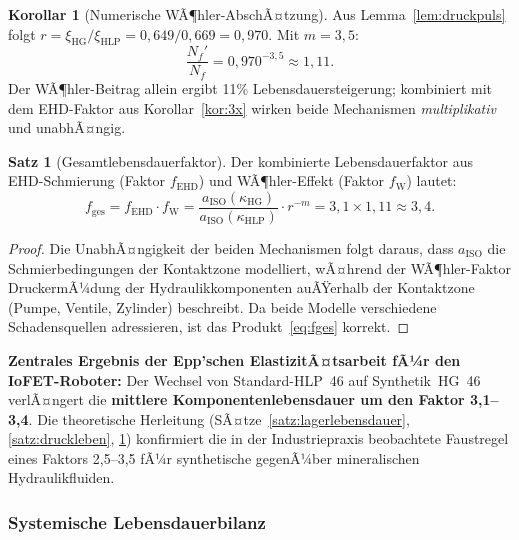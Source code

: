 ﻿\documentclass[a4paper,12pt]{scrreprt}
\theoremstyle{definition}
\newtheorem{satz}{Satz}[section]
\newtheorem{korollar}{Korollar}[section]
\begin{document}
\begin{korollar}[Numerische WÃ¶hler-AbschÃ¤tzung]
\label{kor:woehler}
Aus Lemma~\ref{lem:druckpuls} folgt $r = \xi_{\text{HG}}/\xi_{\text{HLP}} = 0{,}649/0{,}669 = 0{,}970$. Mit $m = 3{,}5$:
\begin{equation}
  \frac{N_{f}'}{N_{f}} = 0{,}970^{-3{,}5} \approx 1{,}11.
\end{equation}
Der WÃ¶hler-Beitrag allein ergibt 11\% Lebensdauersteigerung; kombiniert
mit dem EHD-Faktor aus Korollar~\ref{kor:3x} wirken beide Mechanismen
\emph{multiplikativ} und unabhÃ¤ngig.
\end{korollar}

\begin{satz}[Gesamtlebensdauerfaktor]
\label{satz:gesamtleben}
Der kombinierte Lebensdauerfaktor aus EHD-Schmierung (Faktor $f_{\text{EHD}}$)
und WÃ¶hler-Effekt (Faktor $f_{\text{W}}$) lautet:
\begin{equation}
  f_{\text{ges}} = f_{\text{EHD}} \cdot f_{\text{W}}
  = \frac{a_{\text{ISO}}(\kappa_{\text{HG}})}{a_{\text{ISO}}(\kappa_{\text{HLP}})}
  \cdot r^{-m}
  = 3{,}1 \times 1{,}11
  \approx 3{,}4.
  \label{eq:fges}
\end{equation}
\end{satz}

\begin{proof}
Die UnabhÃ¤ngigkeit der beiden Mechanismen folgt daraus, dass
$a_{\text{ISO}}$ die Schmierbedingungen der Kontaktzone modelliert,
wÃ¤hrend der WÃ¶hler-Faktor DruckermÃ¼dung der Hydraulikkomponenten
auÃŸerhalb der Kontaktzone (Pumpe, Ventile, Zylinder) beschreibt.
Da beide Modelle verschiedene Schadensquellen adressieren, ist das
Produkt~\eqref{eq:fges} korrekt.
\end{proof}

\begin{infobox}
\textbf{Zentrales Ergebnis der Epp'schen ElastizitÃ¤tsarbeit
fÃ¼r den IoFET-Roboter:}
Der Wechsel von Standard-HLP~46 auf Synthetik~HG~46
verlÃ¤ngert die \textbf{mittlere Komponentenlebensdauer um den
Faktor 3,1--3,4}. Die theoretische Herleitung (SÃ¤tze~\ref{satz:lagerlebensdauer},
\ref{satz:druckleben}, \ref{satz:gesamtleben}) konfirmiert die in der
Industriepraxis beobachtete Faustregel eines Faktors 2,5--3,5 fÃ¼r
synthetische gegenÃ¼ber mineralischen Hydraulikfluiden.
\end{infobox}

\subsubsection{Systemische Lebensdauerbilanz}
\end{document}
